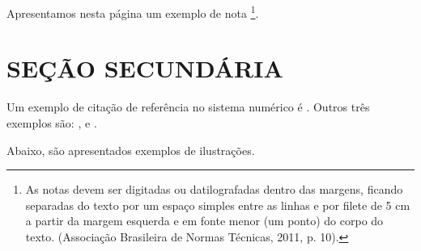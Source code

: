 \documentclass[
        oneside,      %
        english,			
        brazil			 
        ]{abntbibufjf}
\begin{document}
Apresentamos nesta p\'agina um exemplo de nota \footnote{As notas devem ser digitadas ou datilografadas dentro das margens, ficando separadas do texto
por um espa\c{c}o simples entre as linhas e por filete de 5 cm a partir da margem esquerda e em fonte menor (um ponto) do corpo do texto. (Associa\c{c}\~ao
Brasileira de Normas T\'ecnicas, 2011, p. 10).}.




\section{SE\c{C}\~AO SECUND\'ARIA} %

Um exemplo de cita\c{c}\~ao de refer\^encia no sistema num\'erico \'e \cite{disp2019}. Outros três exemplos s\~ao: \cite{Bauman99}, \cite{vet18} e 
\cite{Aguiar2009}.










Abaixo, s\~ao apresentados exemplos de ilustra\c{c}\~oes.
\end{document}
